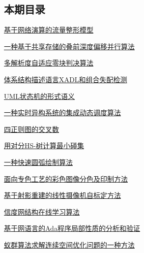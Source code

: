 \documentclass[a4paper]{article}
\begin{document}
\subsection{本期目录}
\href{http://www.jos.org.cn/ch/reader/download_pdf.aspx?file_no=20021202&year_id=2002&quarter_id=12&falg=1}{基于网络演算的流量整形模型}

\href{http://www.jos.org.cn/ch/reader/download_pdf.aspx?file_no=20021203&year_id=2002&quarter_id=12&falg=1}{一种基于共享存储的叠前深度偏移并行算法}

\href{http://www.jos.org.cn/ch/reader/download_pdf.aspx?file_no=20021216&year_id=2002&quarter_id=12&falg=1}{多解析度自适应零块判决算法}

\href{http://www.jos.org.cn/ch/reader/download_pdf.aspx?file_no=20021204&year_id=2002&quarter_id=12&falg=1}{体系结构描述语言XADL和组合失配检测}

\href{http://www.jos.org.cn/ch/reader/download_pdf.aspx?file_no=20021205&year_id=2002&quarter_id=12&falg=1}{UML状态机的形式语义}

\href{http://www.jos.org.cn/ch/reader/download_pdf.aspx?file_no=20021206&year_id=2002&quarter_id=12&falg=1}{一种实时异构系统的集成动态调度算法}

\href{http://www.jos.org.cn/ch/reader/download_pdf.aspx?file_no=20021207&year_id=2002&quarter_id=12&falg=1}{四正则图的交叉数}

\href{http://www.jos.org.cn/ch/reader/download_pdf.aspx?file_no=20021208&year_id=2002&quarter_id=12&falg=1}{用对分HS-树计算最小碰集}

\href{http://www.jos.org.cn/ch/reader/download_pdf.aspx?file_no=20021209&year_id=2002&quarter_id=12&falg=1}{一种快速圆弧绘制算法}

\href{http://www.jos.org.cn/ch/reader/download_pdf.aspx?file_no=20021210&year_id=2002&quarter_id=12&falg=1}{面向专色工艺的彩色图像分色及印制方法}

\href{http://www.jos.org.cn/ch/reader/download_pdf.aspx?file_no=20021211&year_id=2002&quarter_id=12&falg=1}{基于射影重建的线性摄像机自标定方法}

\href{http://www.jos.org.cn/ch/reader/download_pdf.aspx?file_no=20021212&year_id=2002&quarter_id=12&falg=1}{信度网结构在线学习算法}

\href{http://www.jos.org.cn/ch/reader/download_pdf.aspx?file_no=20021213&year_id=2002&quarter_id=12&falg=1}{基于网语言的Ada程序局部性质的分析和验证}

\href{http://www.jos.org.cn/ch/reader/download_pdf.aspx?file_no=20021214&year_id=2002&quarter_id=12&falg=1}{蚁群算法求解连续空间优化问题的一种方法}
\end{document}
